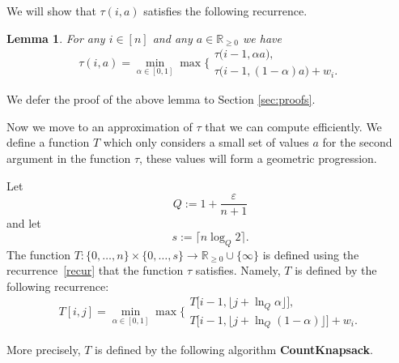 \documentclass[11pt]{article}
\def\R{\mathbb{R}}
\def\eps{\varepsilon}
\def\ra{\rightarrow}
\newtheorem{lemma}{Lemma}[section]
\begin{document}
We will show that $\tau(i,a)$ satisfies the following recurrence.
\begin{lemma}
\label{lem:recur}
For any $i\in [n]$ and any $a\in\R_{\geq 0}$ we have
\begin{equation}\label{recur}
\tau(i,a)=\min_{\alpha\in [0,1]}
\max\Bigg\{\begin{array}{l}
  \tau\big(i-1,\alpha a),\\
  \tau\big(i-1,(1-\alpha)a\big) + w_i.
\end{array}
\end{equation}
\end{lemma}

We defer the proof of the above lemma to Section \ref{sec:proofs}.

Now we move to an approximation of $\tau$ that we can compute efficiently.
We define a function $T$ which only considers a small set of values $a$
for the second argument in the function $\tau$, these values will form a
geometric progression.

Let
$$
Q:=1+\frac{\eps}{n+1}
$$
and let
$$
s:=\lceil n \log_Q 2\rceil.
$$
The function $T:\{0,\dots,n\}\times\{0,\dots,s\}\ra\R_{\geq 0}\cup\{\infty\}$ is defined
using the recurrence~\eqref{recur} that the function $\tau$ satisfies.
Namely, $T$ is defined by the following recurrence:
$$T[i,j] = \min_{\alpha\in [0,1]} \max\Bigg\{\begin{array}{l}
  T\big[i-1,\lfloor j + \ln_{Q}\alpha\rfloor\big],\\
  T\big[i-1,\lfloor j + \ln_{Q}(1-\alpha)\rfloor\big] + w_i.
\end{array}
$$

More precisely, $T$ is defined by the following algorithm {\bf CountKnapsack}.
\end{document}
